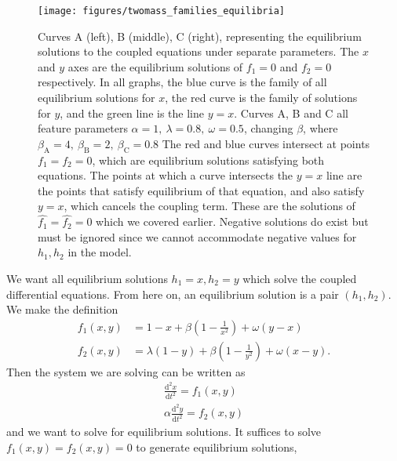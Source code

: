 \begin{figure}[h!]
    \centering
    \texttt{[image: figures/twomass\_families\_equilibria]}
    \caption{
        Curves A (left), B (middle), C (right), representing the equilibrium solutions to the coupled equations under separate parameters.
        The $x$ and $y$ axes are the equilibrium solutions of $f_1 = 0$ and $f_2=0$ respectively. 
        In all graphs, the blue curve is the family of all equilibrium solutions for $x$,
        the red curve is the family of solutions for $y$,
        and the green line is the line $y=x$.
        Curves A, B and C all feature parameters \(\alpha = 1,~\lambda=0.8,~\omega = 0.5\), changing $\beta$,
        where \(\beta_\mathrm{A} = 4,~\beta_\mathrm{B} = 2,~\beta_\mathrm{C} = 0.8\)
        The red and blue curves intersect at points $f_1=f_2=0$,
        which are equilibrium solutions satisfying both equations.
        The points at which a curve intersects the $y=x$ line are the points that satisfy equilibrium of that equation, and also satisfy $y=x$,
        which cancels the coupling term.
        These are the solutions of $\hat{f_1}=\hat{f_2}=0$ which we covered earlier.
        Negative solutions do exist but must be ignored since we cannot accommodate negative values for $h_1, h_2$ in the model.
    }
    \label{fig:twomass_equilibrium_curves}
\end{figure}
We want all equilibrium solutions \(h_1 = x, h_2 = y\) which solve the coupled differential equations.
From here on, an equilibrium solution is a pair \((h_1,h_2)\).
We make the definition
\begin{equation}
    \begin{aligned}
        f_1(x,y) &= 1-x + \beta\left(1 - \frac{1}{x^2}\right) + \omega(y-x) \\
        f_2(x,y) &= \lambda(1-y) + \beta\left(1 - \frac{1}{y^2}\right) + \omega(x-y).
        \label{eqn:twomass_equilibrium_functions}
    \end{aligned}
\end{equation}
Then the system we are solving can be written as
\begin{equation}
    \begin{aligned}
        \frac{\mathrm{d}^2x}{\mathrm{d}t^2} = f_1(x,y) \\
        \alpha\frac{\mathrm{d}^2y}{\mathrm{d}t^2} = f_2(x,y)
        \label{eqn:twomass_slave}  
    \end{aligned}
\end{equation}
and we want to solve for equilibrium solutions. It suffices to solve \(f_1(x,y) = f_2(x,y) = 0\) to generate equilibrium solutions,
